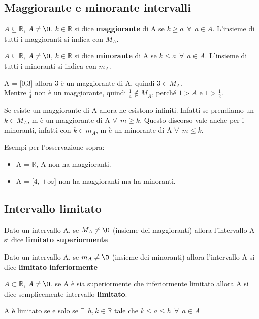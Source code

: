 \subsection{Maggiorante e minorante intervalli}
\begin{definition}[Maggiorante]
$A \subseteq \mathbb{R}$, $A \neq \O$, $k \in \mathbb{R}$ si dice \textbf{maggiorante} di A se $k \geq a \: \: \forall \: \: a \in A$. L'insieme di tutti i maggioranti si indica con $M_A$.
\end{definition}
\begin{definition}[Minorante]
$A \subseteq \mathbb{R}$, $A \neq \O$, $k \in \mathbb{R}$ si dice \textbf{minorante} di A se $k \leq a \: \: \forall \: \: a \in A$. L'insieme di tutti i minoranti si indica con $m_A$.
\end{definition}
\begin{example}
A = [0,3] allora 3 è un maggiorante di A, quindi $3 \in M_A$. \\
Mentre $\frac{1}{4}$ non è un maggiorante, quindi $\frac{1}{4} \notin M_A$, perché $1 > A$ e $1 > \frac{1}{2}$.
\end{example}
\begin{observation}
    Se esiste un maggiorante di A allora ne esistono infiniti. Infatti se prendiamo un $k \in M_A$, m è un maggiorante di A $\forall \: \: m \geq k$.
    Questo discorso vale anche per i minoranti, infatti con $k \in m_A$, m è un minorante di A $\forall \: \: m \leq k$.
    \begin{example}
        Esempi per l'osservazione sopra:
        \begin{itemize}
            \item A = $\mathbb{R}$, A non ha maggioranti.
            \item A = [4, $+\infty$] non ha maggioranti ma ha minoranti.
        \end{itemize}
    \end{example}
\end{observation}

\subsection{Intervallo limitato}
\begin{definition}
    Dato un intervallo A, se $M_A \neq \O$ (insieme dei maggioranti) allora l'intervallo A si dice \textbf{limitato superiormente}
\end{definition}
\begin{definition}
    Dato un intervallo A, se $m_A \neq \O$ (insieme dei minoranti) allora l'intervallo A si dice \textbf{limitato inferiormente}
\end{definition}
\begin{definition}[Limitato]
    $A \subset \mathbb{R}$, $A \neq \O$, se A è sia superiormente che inferiormente limitato allora A si dice semplicemente intervallo \textbf{limitato}.
\end{definition}
\begin{observation}
    A è limitato se e solo se $\exists \: \: h,k \in \mathbb{R}$ tale che $k \leq a \leq h \: \: \forall \: \: a \in A$
\end{observation}

